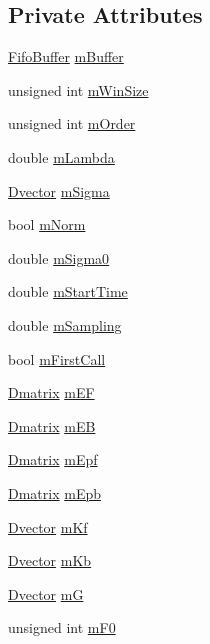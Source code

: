 \subsection*{Private Attributes}
\begin{DoxyCompactItemize}
\item 
\hyperlink{classtsa_1_1_fifo_buffer}{Fifo\+Buffer} \hyperlink{classtsa_1_1_l_s_lfilter_a95e5134738dd70857cf6c7ac52b11639}{m\+Buffer}
\item 
unsigned int \hyperlink{classtsa_1_1_l_s_lfilter_a015aba5b8378277ee5cda011ba6b4fe1}{m\+Win\+Size}
\item 
unsigned int \hyperlink{classtsa_1_1_l_s_lfilter_aa25b337e262a868101f68d8437f162c1}{m\+Order}
\item 
double \hyperlink{classtsa_1_1_l_s_lfilter_aeae300f77e90ba968cc9c5c0eea38a96}{m\+Lambda}
\item 
\hyperlink{namespacetsa_a8900fb03d849baf447a1a0efe2561fb2}{Dvector} \hyperlink{classtsa_1_1_l_s_lfilter_aa620a0738568ad5360806ad189aa70c2}{m\+Sigma}
\item 
bool \hyperlink{classtsa_1_1_l_s_lfilter_a68dda41fd3d7be90171213425541ea2a}{m\+Norm}
\item 
double \hyperlink{classtsa_1_1_l_s_lfilter_a9898a4187911d742deb802e51ec1883f}{m\+Sigma0}
\item 
double \hyperlink{classtsa_1_1_l_s_lfilter_a6e679e1858ec5cab2c2ab00d9ad17a4b}{m\+Start\+Time}
\item 
double \hyperlink{classtsa_1_1_l_s_lfilter_a7d7cc212e5c6a963560a6f18eff72497}{m\+Sampling}
\item 
bool \hyperlink{classtsa_1_1_l_s_lfilter_a23612cc3cfdb9a0dfb38743f54e4d076}{m\+First\+Call}
\item 
\hyperlink{namespacetsa_ad260cd21c1891c4ed391fe788569aba4}{Dmatrix} \hyperlink{classtsa_1_1_l_s_lfilter_a980bad9cc152c400df6f4e1e8c25c111}{m\+EF}
\item 
\hyperlink{namespacetsa_ad260cd21c1891c4ed391fe788569aba4}{Dmatrix} \hyperlink{classtsa_1_1_l_s_lfilter_a24ad0a2f6a2b79b01b1e99ef9c663d1e}{m\+EB}
\item 
\hyperlink{namespacetsa_ad260cd21c1891c4ed391fe788569aba4}{Dmatrix} \hyperlink{classtsa_1_1_l_s_lfilter_a571c1d1b411aad2417ce23579a8da9ac}{m\+Epf}
\item 
\hyperlink{namespacetsa_ad260cd21c1891c4ed391fe788569aba4}{Dmatrix} \hyperlink{classtsa_1_1_l_s_lfilter_a067ccd52ecffc15945fdcb73fa515244}{m\+Epb}
\item 
\hyperlink{namespacetsa_a8900fb03d849baf447a1a0efe2561fb2}{Dvector} \hyperlink{classtsa_1_1_l_s_lfilter_a83a3095a513fda5efd6b75aaa77495df}{m\+Kf}
\item 
\hyperlink{namespacetsa_a8900fb03d849baf447a1a0efe2561fb2}{Dvector} \hyperlink{classtsa_1_1_l_s_lfilter_ae3b9ac48debc547e1aa69ae0ade36408}{m\+Kb}
\item 
\hyperlink{namespacetsa_a8900fb03d849baf447a1a0efe2561fb2}{Dvector} \hyperlink{classtsa_1_1_l_s_lfilter_a0a2ad9e25528879045483500ff6401b0}{mG}
\item 
unsigned int \hyperlink{classtsa_1_1_l_s_lfilter_a490187ff893b2ff71a5f36f9b4efe7f3}{m\+F0}
\end{DoxyCompactItemize}


